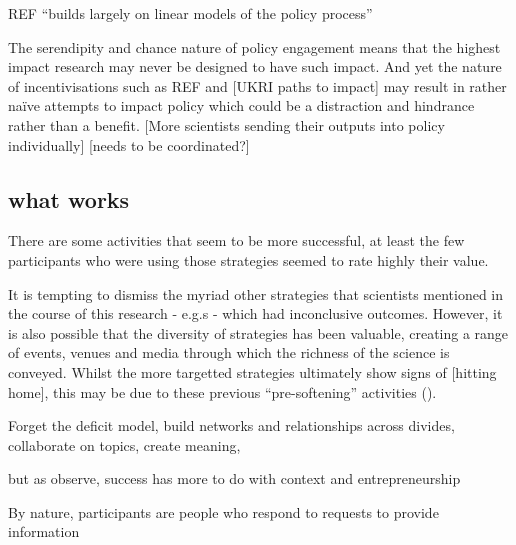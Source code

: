 REF ``builds largely on linear models of the policy process'' \cite{CairneyO2020}

The serendipity and chance nature of policy engagement means that the highest impact research may never be designed to have such impact. And yet the nature of incentivisations such as REF and [UKRI paths to impact] may result in rather na\"ive attempts to impact policy which could be a distraction and hindrance rather than a benefit. [More scientists sending their outputs into policy individually] [needs to be coordinated?]

\subsection{what works}
There are some activities that seem to be more successful, at least the few participants who were using those strategies seemed to rate highly their value. 

It is tempting to dismiss the myriad other strategies that scientists mentioned in the course of this research - e.g.s - which had inconclusive outcomes. However, it is also possible that the diversity of strategies has been valuable, creating a range of events, venues and media through which the richness of the science is conveyed. Whilst the more targetted strategies ultimately show signs of [hitting home], this may be due to these previous ``pre-softening'' activities (\cite{Cairney2018}).

Forget the deficit model, build networks and relationships across divides, collaborate on topics, create meaning, 

but as \textcite{CairneyO2020} observe, success has more to do with context and entrepreneurship

By nature, participants are people who respond to requests to provide information

